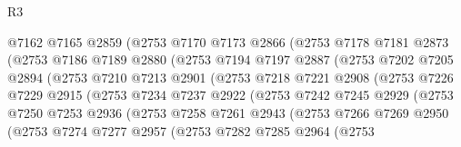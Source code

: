 \begin{lexlean}{R3}
\begin{coremodule}
                    @7162
                    @7165
                    @2859
                    (@2753
                      @7170
                      @7173
                      @2866
                      (@2753
                        @7178
                        @7181
                        @2873
                        (@2753
                          @7186
                          @7189
                          @2880
                          (@2753
                            @7194
                            @7197
                            @2887
                            (@2753
                              @7202
                              @7205
                              @2894
                              (@2753
                                @7210
                                @7213
                                @2901
                                (@2753
                                  @7218
                                  @7221
                                  @2908
                                  (@2753
                                    @7226
                                    @7229
                                    @2915
                                    (@2753
                                      @7234
                                      @7237
                                      @2922
                                      (@2753
                                        @7242
                                        @7245
                                        @2929
                                        (@2753
                                          @7250
                                          @7253
                                          @2936
                                          (@2753
                                            @7258
                                            @7261
                                            @2943
                                            (@2753
                                              @7266
                                              @7269
                                              @2950
                                              (@2753
                                                @7274
                                                @7277
                                                @2957
                                                (@2753
                                                  @7282
                                                  @7285
                                                  @2964
                                                  (@2753

\end{coremodule}
\end{lexlean}

